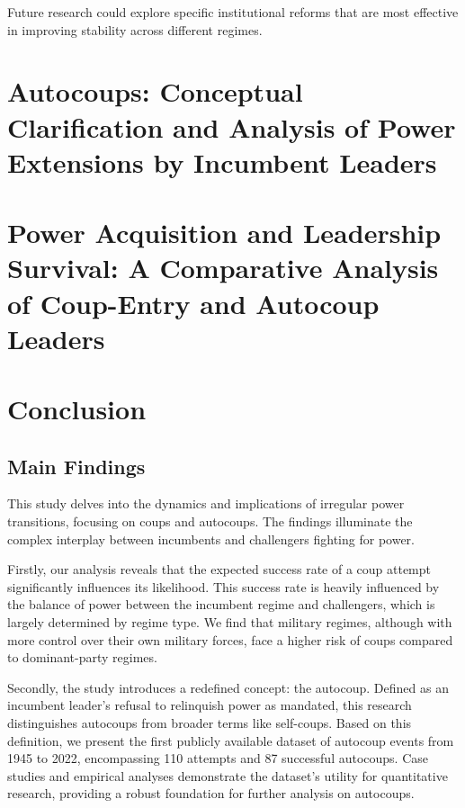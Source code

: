 \documentclass[
  12pt,
]{report}
\begin{document}
Future research could explore specific institutional reforms that are
most effective in improving stability across different regimes.

\chapter{Autocoups: Conceptual Clarification and Analysis of Power
Extensions by Incumbent
Leaders}\label{autocoups-conceptual-clarification-and-analysis-of-power-extensions-by-incumbent-leaders}

\chapter{Power Acquisition and Leadership Survival: A Comparative
Analysis of Coup-Entry and Autocoup
Leaders}\label{power-acquisition-and-leadership-survival-a-comparative-analysis-of-coup-entry-and-autocoup-leaders}

\chapter{Conclusion}\label{conclusion-1}

\section{Main Findings}\label{main-findings}

This study delves into the dynamics and implications of irregular power
transitions, focusing on coups and autocoups. The findings illuminate
the complex interplay between incumbents and challengers fighting for
power.

Firstly, our analysis reveals that the expected success rate of a coup
attempt significantly influences its likelihood. This success rate is
heavily influenced by the balance of power between the incumbent regime
and challengers, which is largely determined by regime type. We find
that military regimes, although with more control over their own
military forces, face a higher risk of coups compared to dominant-party
regimes.

Secondly, the study introduces a redefined concept: the autocoup.
Defined as an incumbent leader's refusal to relinquish power as
mandated, this research distinguishes autocoups from broader terms like
self-coups. Based on this definition, we present the first publicly
available dataset of autocoup events from 1945 to 2022, encompassing 110
attempts and 87 successful autocoups. Case studies and empirical
analyses demonstrate the dataset's utility for quantitative research,
providing a robust foundation for further analysis on autocoups.
\end{document}
